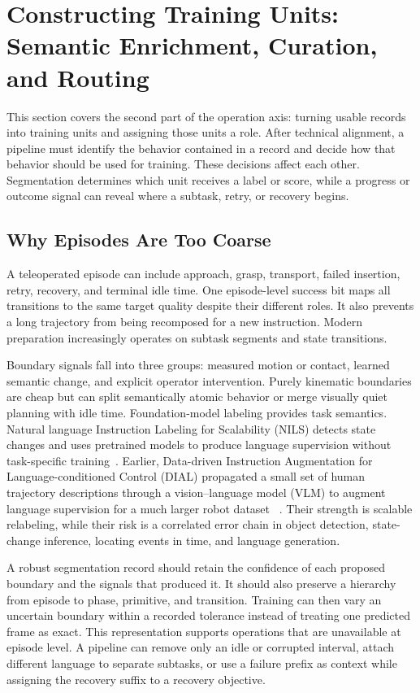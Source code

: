\section{Constructing Training Units: Semantic Enrichment, Curation, and Routing}
\label{sec:curation}

This section covers the second part of the operation axis: turning usable records into training units and assigning those units a role.
After technical alignment, a pipeline must identify the behavior contained in a record and decide how that behavior should be used for training.
These decisions affect each other.
Segmentation determines which unit receives a label or score, while a progress or outcome signal can reveal where a subtask, retry, or recovery begins.

\subsection{Why Episodes Are Too Coarse}

A teleoperated episode can include approach, grasp, transport, failed insertion, retry, recovery, and terminal idle time.
One episode-level success bit maps all transitions to the same target quality despite their different roles.
It also prevents a long trajectory from being recomposed for a new instruction.
Modern preparation increasingly operates on subtask segments and state transitions.

Boundary signals fall into three groups: measured motion or contact, learned semantic change, and explicit operator intervention.
Purely kinematic boundaries are cheap but can split semantically atomic behavior or merge visually quiet planning with idle time.
Foundation-model labeling provides task semantics.
Natural language Instruction Labeling for Scalability (NILS) detects state changes and uses pretrained models to produce language supervision without task-specific training~\cite{blank2024scaling_2410_17772}.
Earlier, Data-driven Instruction Augmentation for Language-conditioned Control (DIAL) propagated a small set of human trajectory descriptions through a vision--language model (VLM) to augment language supervision for a much larger robot dataset ~\cite{xiao2022robotic_2211_11736}.
Their strength is scalable relabeling, while their risk is a correlated error chain in object detection, state-change inference, locating events in time, and language generation.

A robust segmentation record should retain the confidence of each proposed boundary and the signals that produced it.
It should also preserve a hierarchy from episode to phase, primitive, and transition.
Training can then vary an uncertain boundary within a recorded tolerance instead of treating one predicted frame as exact.
This representation supports operations that are unavailable at episode level.
A pipeline can remove only an idle or corrupted interval, attach different language to separate subtasks, or use a failure prefix as context while assigning the recovery suffix to a recovery objective.

